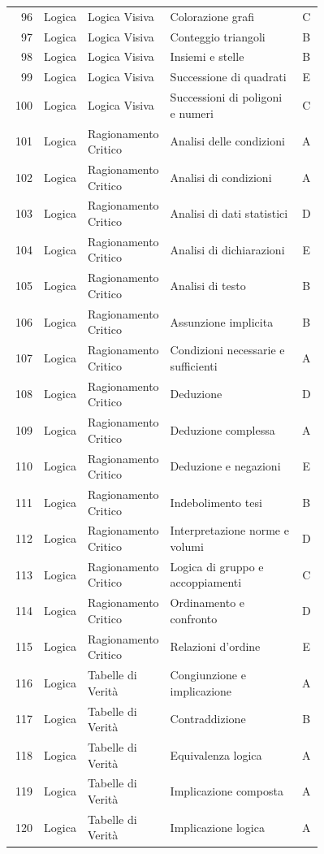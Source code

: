 \documentclass[20pt, a4paper]{article}
\begin{document}
\begin{longtable}{@{}r>{\raggedright\arraybackslash}p{0.14\linewidth}>{\raggedright\arraybackslash}p{0.20\linewidth}>{\raggedright\arraybackslash}p{0.42\linewidth}c@{}}
96 & Logica & Logica Visiva & Colorazione grafi & C \\
97 & Logica & Logica Visiva & Conteggio triangoli & B \\
98 & Logica & Logica Visiva & Insiemi e stelle & B \\
99 & Logica & Logica Visiva & Successione di quadrati & E \\
100 & Logica & Logica Visiva & Successioni di poligoni e numeri & C \\
101 & Logica & Ragionamento Critico & Analisi delle condizioni & A \\
102 & Logica & Ragionamento Critico & Analisi di condizioni & A \\
103 & Logica & Ragionamento Critico & Analisi di dati statistici & D \\
104 & Logica & Ragionamento Critico & Analisi di dichiarazioni & E \\
105 & Logica & Ragionamento Critico & Analisi di testo & B \\
106 & Logica & Ragionamento Critico & Assunzione implicita & B \\
107 & Logica & Ragionamento Critico & Condizioni necessarie e sufficienti & A \\
108 & Logica & Ragionamento Critico & Deduzione & D \\
109 & Logica & Ragionamento Critico & Deduzione complessa & A \\
110 & Logica & Ragionamento Critico & Deduzione e negazioni & E \\
111 & Logica & Ragionamento Critico & Indebolimento tesi & B \\
112 & Logica & Ragionamento Critico & Interpretazione norme e volumi & D \\
113 & Logica & Ragionamento Critico & Logica di gruppo e accoppiamenti & C \\
114 & Logica & Ragionamento Critico & Ordinamento e confronto & D \\
115 & Logica & Ragionamento Critico & Relazioni d'ordine & E \\
116 & Logica & Tabelle di Verità & Congiunzione e implicazione & A \\
117 & Logica & Tabelle di Verità & Contraddizione & B \\
118 & Logica & Tabelle di Verità & Equivalenza logica & A \\
119 & Logica & Tabelle di Verità & Implicazione composta & A \\
120 & Logica & Tabelle di Verità & Implicazione logica & A \\

\end{longtable}
\end{document}
